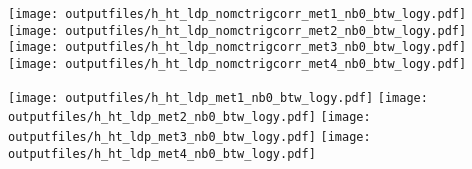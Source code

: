 \documentclass[11pt]{article}
\begin{document}
    \noindent
     \texttt{[image: outputfiles/h\_ht\_ldp\_nomctrigcorr\_met1\_nb0\_btw\_logy.pdf]}
     \texttt{[image: outputfiles/h\_ht\_ldp\_nomctrigcorr\_met2\_nb0\_btw\_logy.pdf]}
     \texttt{[image: outputfiles/h\_ht\_ldp\_nomctrigcorr\_met3\_nb0\_btw\_logy.pdf]}
     \texttt{[image: outputfiles/h\_ht\_ldp\_nomctrigcorr\_met4\_nb0\_btw\_logy.pdf]}

    \noindent
     \texttt{[image: outputfiles/h\_ht\_ldp\_met1\_nb0\_btw\_logy.pdf]}
     \texttt{[image: outputfiles/h\_ht\_ldp\_met2\_nb0\_btw\_logy.pdf]}
     \texttt{[image: outputfiles/h\_ht\_ldp\_met3\_nb0\_btw\_logy.pdf]}
     \texttt{[image: outputfiles/h\_ht\_ldp\_met4\_nb0\_btw\_logy.pdf]}

   \clearpage





\end{document}
